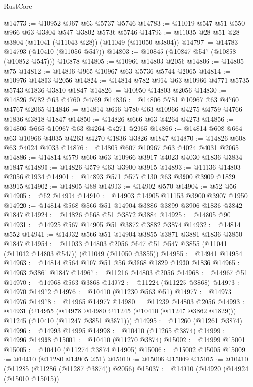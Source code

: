 \begin{lexlean}{RustCore}
\begin{coremodule}
@14773 := @10952 @967 @63 @5737 @5746
@14783 := @11019 @547 @51 @550 @966 @63 @3804 @547 @3802 @5736 @5746
@14793 := @11035 @28 @51 @28 @3804 (@11041 (@11043 @28)) (@11049 (@11050 @3804))
@14797 := @14783 @14793 (@10410 (@11056 @547))
@14803 := @10845 (@10847 @547 (@10858 (@10852 @547))) @10878
@14805 := @10960 @14803 @2056
@14806 := @14805 @75
@14812 := @14806 @965 @10967 @63 @5736 @5744 @2065
@14814 := @10976 @14803 @2056
@14824 := @14814 @782 @964 @63 @10966 @4771 @5735 @5743 @1836 @3810 @1847
@14826 := @10950 @14803 @2056
@14830 := @14826 @782 @63 @4760 @4769
@14836 := @14806 @781 @10967 @63 @4760 @4767 @2065
@14846 := @14814 @666 @780 @63 @10966 @4275 @4759 @4766 @1836 @3818 @1847
@14850 := @14826 @666 @63 @4264 @4273
@14856 := @14806 @665 @10967 @63 @4264 @4271 @2065
@14866 := @14814 @608 @664 @63 @10966 @4035 @4263 @4270 @1836 @3826 @1847
@14870 := @14826 @608 @63 @4024 @4033
@14876 := @14806 @607 @10967 @63 @4024 @4031 @2065
@14886 := @14814 @579 @606 @63 @10966 @3917 @4023 @4030 @1836 @3834 @1847
@14890 := @14826 @579 @63 @3900 @3915
@14893 := @11136 @14803 @2056 @1934
@14901 := @14893 @571 @577 @130 @63 @3900 @3909 @1829 @3915
@14902 := @14805 @88
@14903 := @14902 @570
@14904 := @52 @56
@14905 := @52 @14904
@14910 := @14903 @14905 @11153 @3900 @3907 @1950
@14920 := @14814 @568 @566 @51 @14904 @3886 @3899 @3906 @1836 @3842 @1847
@14924 := @14826 @568 @51 @3872 @3884
@14925 := @14805 @90
@14931 := @14925 @567 @14905 @51 @3872 @3882 @3874
@14932 := @14814 @552
@14941 := @14932 @566 @51 @14904 @3855 @3871 @3881 @1836 @3850 @1847
@14954 := @11033
    @14803
    @2056
    @547
    @51
    @547
    @3855
    (@11041 (@11042 @14803 @547))
    (@11049 (@11050 @3855))
@14955 := @14941 @14954
@14963 := @14814 @564 @107 @51 @56 @3868 @1829 @1930 @1836
@14965 := @14963 @3861 @1847
@14967 := @11216 @14803 @2056
@14968 := @14967 @51
@14970 := @14968 @563 @3868
@14972 := @11224 (@11225 @3868)
@14973 := @14970 @14972
@14976 := @10410 (@11230 @563 @51)
@14977 := @14973 @14976
@14978 := @14965 @14977
@14980 := @11239 @14803 @2056
@14993 := @14931
    (@14955
      (@14978 @14980 @11245 (@10410 (@11247 @3862 @1829)))
      @11245
      (@10410 (@11247 @3851 @3871)))
@14995 := @11260 (@11261 @3874)
@14996 := @14993 @14995
@14998 := @10410 (@11265 @3874)
@14999 := @14996 @14998
@15001 := @10410 (@11270 @3874)
@15002 := @14999 @15001
@15005 := @10410 (@11274 @3874 @14905)
@15006 := @15002 @15005
@15009 := @10410 (@11280 @14905 @51)
@15010 := @15006 @15009
@15015 := @10410 (@11285 (@11286 (@11287 @3874)) @2056)
@15037 := @14910
    (@14920
      (@14924 (@15010 @15015))

\end{coremodule}
\end{lexlean}

